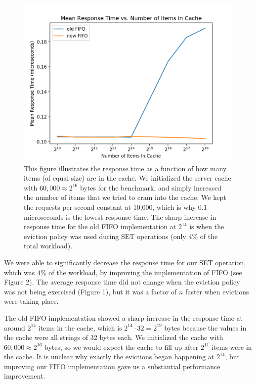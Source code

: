 \documentclass[12pt]{article}
\begin{document}
\begin{figure}
\centering
\includegraphics[scale=0.75]{resp_time_items_cache_newold.png}
\caption{This figure illustrates the response time as a function of how many items (of equal size) are in the cache. We initialized the server cache with $60,000 \approx 2^{16}$ bytes for the  benchmark, and simply increased the number of items that we tried to cram into the cache. We kept the requests per second constant at 10,000, which is why 0.1 microseconds is the lowest response time. The sharp increase in response time for the old FIFO implementation at $2^{14}$ is when the eviction policy was used during SET operations (only 4\% of the total workload).}
\end{figure}

We were able to significantly decrease the response time for our SET operation, which was $4\%$ of the workload, by improving the implementation of FIFO (see Figure 2). The average response time did not change when the eviction policy was not being exercised (Figure 1), but it was a factor of $n$ faster when evictions were taking place. 

The old FIFO implementation showed a sharp increase in the response time at around $2^{14}$ items in the cache, which is $2^{14} \cdot 32 = 2^{19}$ bytes because the values in the cache were all strings of 32 bytes each. We initialized the cache with $60,000 \approx 2^{16}$ bytes, so we would expect the cache to fill up after $2^{11}$ items were in the cache. It is unclear why exactly the evictions began happening at $2^{14}$, but improving our FIFO implementation gave us a substantial performance improvement. 
\end{document}
